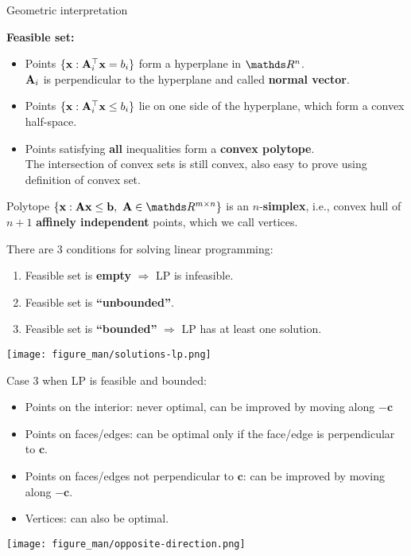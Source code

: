 \documentclass[11pt,compress,t,notes=noshow, xcolor=table]{beamer}
\begin{document}
\begin{vbframe}{Geometric interpretation}
    
\textbf{Feasible set:}
\begin{itemize}
    \setlength{\itemsep}{1em}
    \item Points $\{\mathbf{x}: \mathbf{A}_i^\top \mathbf{x} = b_i\}$ form a hyperplane in $\R^n$.\\
          $\mathbf{A}_i$ is perpendicular to the hyperplane and called \textbf{normal vector}.
    \item Points $\{\mathbf{x}: \mathbf{A}_i^\top \mathbf{x} \le b_i\}$ lie on one side of the hyperplane, which form a convex half-space.
    \item Points satisfying \textbf{all} inequalities form a \textbf{convex polytope}.\\
          The intersection of convex sets is still convex, also easy to prove using definition of convex set.
\end{itemize}

\lz

Polytope $\{\xv: \Amat \xv \le \mathbf{b},\ \Amat \in \R^{m \times n}\}$ is an $n$-\textbf{simplex}, i.e., 
convex hull of $n + 1$ \textbf{affinely independent} points, which we call vertices.

\framebreak

There are 3 conditions for solving linear programming:
\begin{enumerate}
\item Feasible set is \textbf{empty} $\Rightarrow$ LP is infeasible.
\item Feasible set is \textbf{\enquote{unbounded}}.
\item Feasible set is \textbf{\enquote{bounded}} $\Rightarrow$ LP has at least one solution.
\end{enumerate}

\begin{center}
    \texttt{[image: figure\_man/solutions-lp.png]}
\end{center}

\framebreak

Case 3 when LP is feasible and bounded:
\begin{itemize}
\item Points on the interior: never optimal, can be improved by moving along $-\mathbf{c}$
\item Points on faces/edges: can be optimal only if the face/edge is perpendicular to $\mathbf{c}$. 
\item Points on faces/edges not perpendicular to $\mathbf{c}$: can be improved by moving along $-\mathbf{c}$.
\item Vertices: can also be optimal.
\end{itemize}

\begin{center}
    \texttt{[image: figure\_man/opposite-direction.png]}
\end{center}

\end{vbframe}
\end{document}
